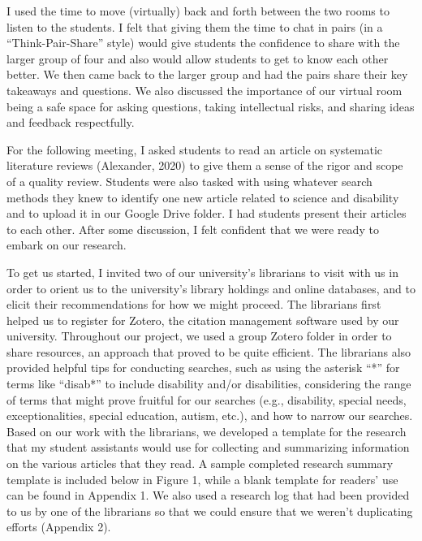 \documentclass[11.5pt]{sig-alternate}
\begin{document}
\begin{large}
I used the time to move (virtually) back and forth between the two rooms to listen to the students.  I felt that giving them the time to chat in pairs (in a “Think-Pair-Share” style) would give students the confidence to share with the larger group of four and also would allow students to get to know each other better.  We then came back to the larger group and had the pairs share their key takeaways and questions. We also discussed the importance of our virtual room being a safe space for asking questions, taking intellectual risks, and sharing ideas and feedback respectfully.  

For the following meeting, I asked students to read an article on systematic literature reviews (Alexander, 2020) to give them a sense of the rigor and scope of a quality review.  Students were also tasked with using whatever search methods they knew to identify one new article related to science and disability and to upload it in our Google Drive folder.  I had students present their articles to each other. After some discussion, I felt confident that we were ready to embark on our research. 

To get us started, I invited two of our university’s librarians to visit with us in order to orient us to the university’s library holdings and online databases, and to elicit their recommendations for how we might proceed.  The librarians first helped us to register for Zotero, the citation management software used by our university. Throughout our project, we used a group Zotero folder in order to share resources, an approach that proved to be quite efficient. The librarians also provided helpful tips for conducting searches, such as using the asterisk “*” for terms like “disab*” to include disability and/or disabilities, considering the range of terms that might prove fruitful for our searches (e.g., disability, special needs, exceptionalities, special education, autism, etc.), and how to narrow our searches.  Based on our work with the librarians, we developed a template for the research that my student assistants would use for collecting and summarizing information on the various articles that they read. A sample completed research summary template is included below in Figure 1, while a blank template for readers’ use can be found in Appendix 1. We also used a research log that had been provided to us by one of the librarians so that we could ensure that we weren’t duplicating efforts (Appendix 2).


\end{large}
\end{document}
